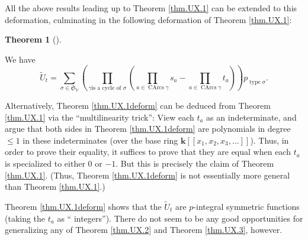 \documentclass[numbers=enddot,12pt,final,onecolumn,notitlepage]{scrartcl}%
\numberwithin{exer}{section}
\theoremstyle{definition}
\newtheorem{theo}{Theorem}[section]
\newenvironment{theorem}[1][]
{\begin{theo}[#1]\begin{leftbar}}
{\end{leftbar}\end{theo}}
\let\sumnonlimits\sum
\let\prodnonlimits\prod
\renewcommand{\sum}{\sumnonlimits\limits}
\renewcommand{\prod}{\prodnonlimits\limits}
\begin{document}
All the above results leading up to Theorem \ref{thm.UX.1} can be extended to
this deformation, culminating in the following deformation of Theorem
\ref{thm.UX.1}:

\begin{theorem}
\label{thm.UX.1deform}We have%
\[
\widetilde{U}_{t}=\sum_{\sigma\in\mathfrak{S}_{V}}\left(  \prod_{\gamma\text{
is a cycle of }\sigma}\left(  \prod_{a\in\operatorname*{CArcs}\gamma}%
s_{a}-\prod_{a\in\operatorname*{CArcs}\gamma}t_{a}\right)  \right)
p_{\operatorname*{type}\sigma}.
\]

\end{theorem}

Alternatively, Theorem \ref{thm.UX.1deform} can be deduced from Theorem
\ref{thm.UX.1} via the \textquotedblleft multilinearity
trick\textquotedblright: View each $t_{a}$ as an indeterminate, and argue that
both sides in Theorem \ref{thm.UX.1deform} are polynomials in degree $\leq1$
in these indeterminates (over the base ring $\mathbf{k}\left[  \left[
x_{1},x_{2},x_{3},\ldots\right]  \right]  $). Thus, in order to prove their
equality, it suffices to prove that they are equal when each $t_{a}$ is
specialized to either $0$ or $-1$. But this is precisely the claim of Theorem
\ref{thm.UX.1}. (Thus, Theorem \ref{thm.UX.1deform} is not essentially more
general than Theorem \ref{thm.UX.1}.)

Theorem \ref{thm.UX.1deform} shows that the $\widetilde{U}_{t}$ are
$p$-integral symmetric functions (taking the $t_{a}$ as \textquotedblleft
integers\textquotedblright). There do not seem to be any good opportunities
for generalizing any of Theorem \ref{thm.UX.2} and Theorem \ref{thm.UX.3}, however.
\end{document}
